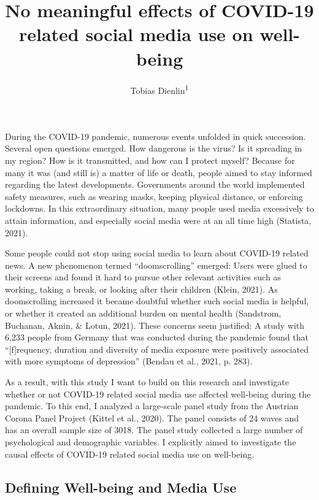 \documentclass[
  english,
  man,mask,floatsintext]{apa6}
\title{No meaningful effects of COVID-19 related social media use on well-being}
\author{Tobias Dienlin\textsuperscript{1}}
\date{}
\affiliation{\vspace{0.5cm}\textsuperscript{1} University of Vienna}
\begin{document}
\maketitle

During the COVID-19 pandemic,
numerous events unfolded in quick succession.
Several open questions emerged.
How dangerous is the virus?
Is it spreading in my region?
How is it transmitted, and how can I protect myself?
Because for many it was (and still is) a matter of life or death, people aimed to stay informed regarding the latest developments.
Governments around the world implemented safety measures, such as wearing masks, keeping physical distance, or enforcing lockdowns.
In this extraordinary situation, many people used media excessively to attain information, and especially social media were at an all time high (Statista, 2021).

Some people could not stop using social media to learn about COVID-19 related news.
A new phenomenon termed ``doomscrolling'' emerged:
Users were glued to their screens and found it hard to pursue other relevant activities such as working, taking a break, or looking after their children (Klein, 2021).
As doomscrolling increased it became doubtful whether such social media is helpful, or whether it created an additional burden on mental health (Sandstrom, Buchanan, Aknin, \& Lotun, 2021).
These concerns seem justified:
A study with 6,233 people from Germany that was conducted during the pandemic found that ``{[}f{]}requency, duration and diversity of media exposure were positively associated with more symptoms of depression'' (Bendau et al., 2021, p. 283).

As a result, with this study I want to build on this research and investigate whether or not COVID-19 related social media use affected well-being during the pandemic.
To this end, I analyzed a large-scale panel study from the Austrian Corona Panel Project (Kittel et al., 2020).
The panel consists of 24 waves and has an overall sample size of 3018.
The panel study collected a large number of psychological and demographic variables.
I explicitly aimed to investigate the causal effects of COVID-19 related social media use on well-being.

\hypertarget{defining-well-being-and-media-use}{%
\subsection{Defining Well-being and Media Use}\label{defining-well-being-and-media-use}}
\end{document}
